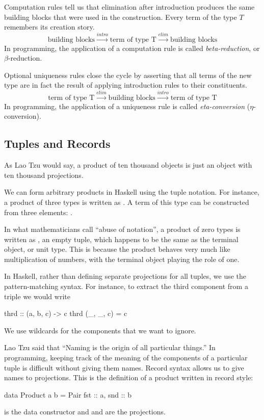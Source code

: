 \documentclass[DaoFP]{subfiles}
\begin{document}
Computation rules tell us that elimination after introduction produces the same building blocks that were used in the construction. Every term of the type $T$ remembers its creation story.
\[ \text{building blocks} \xrightarrow{intro} \text{term of type T} \xrightarrow{elim} \text{building blocks} \]
In programming, the application of a computation rule is called \emph{beta-reduction}, or $\beta$-reduction.


Optional uniqueness rules close the cycle by asserting that all terms of the new type are in fact the result of applying introduction rules to their constituents. 
\[ \text{term of type T} \xrightarrow{elim} \text{building blocks} \xrightarrow{intro} \text{term of type T} \]
In programming, the application of a uniqueness rule is called \emph{eta-conversion}  ($\eta$-conversion).

\subsection{Tuples and Records}

As Lao Tzu would say, a product of ten thousand objects is just an object with ten thousand projections. 

We can form arbitrary products in Haskell using the tuple notation. For instance, a product of three types is written as . A term of this type can be constructed from three elements: . 

In what mathematicians call ``abuse of notation'', a product of zero types is written as \hask{()}, an empty tuple, which happens to be the same as the terminal object, or unit type. This is because the product behaves very much like multiplication of numbers, with the terminal object playing the role of one.

In Haskell, rather than defining separate projections for all tuples, we use the pattern-matching syntax. For instance, to extract the third component from a triple we would write

\begin{haskell}
thrd :: (a, b, c) -> c
thrd (_, _, c) = c
\end{haskell}
We use wildcards for the components that we want to ignore.

Lao Tzu said that ``Naming is the origin of all particular things.'' In programming, keeping track of the meaning of the components of a particular tuple is difficult without giving them names. Record syntax allows us to give names to projections. This is the definition of a product written in record style:
\begin{haskell}
data Product a b = Pair { fst :: a, snd :: b }
\end{haskell}
 is the data constructor and  and  are the projections. 
\end{document}
